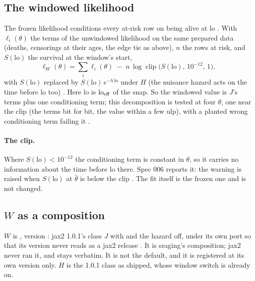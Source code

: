 \subsection{The windowed likelihood}\label{sec:win-lik}

The frozen likelihood conditions every at-risk row on being alive at lo . With
$\ell_i(\theta)$ the terms of the unwindowed likelihood on the same prepared data (deaths, censorings at their ages, the
edge tie as above), $n$ the rows at risk, and $S(\mathrm{lo})$ the survival at the window's start,
\begin{equation}\label{eq:win-cond}
  \ell_W(\theta)=\sum_i\ell_i(\theta)\;-\;n\,\log\operatorname{clip}\!\big(S(\mathrm{lo}),\,10^{-12},\,1\big),
\end{equation}
with $S(\mathrm{lo})$ replaced by $S(\mathrm{lo})\,e^{-h\,\mathrm{lo}}$ under $H$ (the nuisance hazard acts on the time
before lo too) . Here lo is $\mathrm{lo}_{\rm eff}$ of the snap. So the windowed value
is $J$'s terms plus one conditioning term; this decomposition is tested at four $\theta$, one near the clip (the terms
bit for bit, the value within a few ulp), with a planted wrong conditioning term failing it .

\paragraph{The clip.} Where $S(\mathrm{lo})<10^{-12}$ the conditioning term is constant in $\theta$, so it carries no
information about the time before lo there. Spec 006 reports it: the warning  is raised when $S(\mathrm{lo})$ at
$\hat\theta$ is below the clip . The fit itself is the frozen one
and is not changed.

\subsection{$W$ as a composition}\label{sec:win-w}

$W$ is , version : jax2 1.0.1's class $J$ with  and the hazard
off, under its own port so that its version never reads as a jax2 release
. It is sraging's composition; jax2 never ran it, and
 stays verbatim. It is not the default, and it is registered at its own version only.
$H$ is the 1.0.1 class as shipped, whose window switch is already on.

